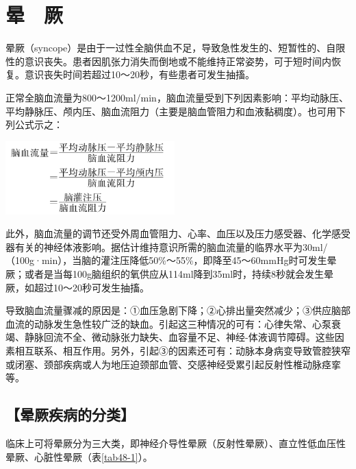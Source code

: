 \chapter{晕　厥}

晕厥（syncope）是由于一过性全脑供血不足，导致急性发生的、短暂性的、自限性的意识丧失。患者因肌张力消失而倒地或不能维持正常姿势，可于短时间内恢复。意识丧失时间若超过10～20秒，有些患者可发生抽搐。

正常全脑血流量为800～1200ml/min，脑血流量受到下列因素影响：平均动脉压、平均静脉压、颅内压、脑血流阻力（主要是脑血管阻力和血液黏稠度）。也可用下列公式示之：

\includegraphics[width=2.57292in,height=1.11458in]{./images/Image00302.jpg}

此外，脑血流量的调节还受外周血管阻力、心率、血压以及压力感受器、化学感受器有关的神经体液影响。据估计维持意识所需的脑血流量的临界水平为30ml/（100g·min），当脑的灌注压降低50\%～55\%，即降至45～60mmHg时可发生晕厥；或者是当每100g脑组织的氧供应从114ml降到35ml时，持续8秒就会发生晕厥，如超过10～20秒可发生抽搐。

导致脑血流量骤减的原因是：①血压急剧下降；②心排出量突然减少；③供应脑部血流的动脉发生急性较广泛的缺血。引起这三种情况的可有：心律失常、心泵衰竭、静脉回流不全、微动脉张力缺失、血容量不足、神经-体液调节障碍。这些因素相互联系、相互作用。另外，引起③的因素还可有：动脉本身病变导致管腔狭窄或闭塞、颈部疾病或人为地压迫颈部血管、交感神经受累引起反射性椎动脉痉挛等。

\section{【晕厥疾病的分类】}

临床上可将晕厥分为三大类，即神经介导性晕厥（反射性晕厥）、直立性低血压性晕厥、心脏性晕厥（表\ref{tab48-1}）。

